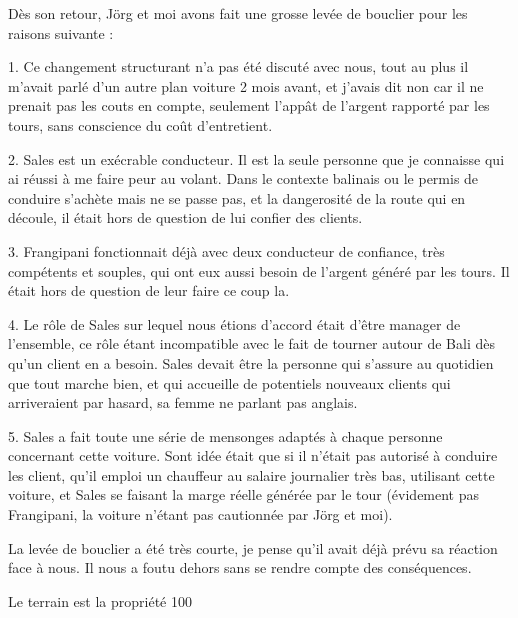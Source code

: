 \begin{multicols}{2}
Dès son retour, Jörg et moi avons fait une grosse levée de bouclier pour les raisons suivante :

1. Ce changement structurant n’a pas été discuté avec nous, tout au plus il m’avait parlé d’un autre plan voiture 2 mois avant, et j’avais dit non car il ne prenait pas les couts en compte, seulement l’appât de l’argent rapporté par les tours, sans conscience du coût d’entretient.

2. Sales est un exécrable conducteur. Il est la seule personne que je connaisse qui ai réussi à me faire peur au volant. Dans le contexte balinais ou le permis de conduire s’achète mais ne se passe pas, et la dangerosité de la route qui en découle, il était hors de question de lui confier des clients.

3. Frangipani fonctionnait déjà avec deux conducteur de confiance, très compétents et souples, qui ont eux aussi besoin de l’argent généré par les tours. Il était hors de question de leur faire ce coup la.

4. Le rôle de Sales sur lequel nous étions d’accord était d’être manager de l’ensemble, ce rôle étant incompatible avec le fait de tourner autour de Bali dès qu’un client en a besoin. Sales devait être la personne qui s’assure au quotidien que tout marche bien, et qui accueille de potentiels nouveaux clients qui arriveraient par hasard, sa femme ne parlant pas anglais.

5. Sales a fait toute une série de mensonges adaptés à chaque personne concernant cette voiture. Sont idée était que si il n’était pas autorisé à conduire les client, qu’il emploi un chauffeur au salaire journalier très bas, utilisant cette voiture, et Sales se faisant la marge réelle générée par le tour (évidement pas Frangipani, la voiture n’étant pas cautionnée par Jörg et moi).

La levée de bouclier a été très courte, je pense qu’il avait déjà prévu sa réaction face à nous. Il nous a foutu dehors sans se rendre compte des conséquences.

Le terrain est la propriété 100%


\end{multicols}
